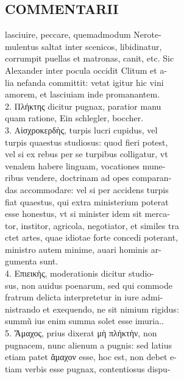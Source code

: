 \documentclass{article}
\begin{document}
\begin{pages}
\section*{COMMENTARII \\
                }lasciuire, peccare, quemadmodum Nerote- \\
                mulentus saltat inter scenicos, libidinatur, \\
                corrumpit puellas et matronas, canit, etc. Sic \\
                Alexander inter pocula occidit Clitum et a- \\
                lia nefanda committit: vetat igitur hic vini \\
                amorem, et lasciuiam inde promanantem. \\
                2. Πλήκτης dicitur pugnax, paratior manu \\
                quam ratione, Ein schlegler, boccher. \\
                3. Αἰσχροκερδὴς, turpis lucri cupidus, vel \\
                turpis quaestus studiosus: quod fieri potest, \\
                vel si ex rebus per se turpibus colligatur, vt \\
                venalem habere linguam, vocationes mune- \\
                ribus vendere, doctrinam ad opes comparan- \\
                das accommodare: vel si per accidens turpis \\
                fiat quaestus, qui extra ministerium poterat \\
                esse honestus, vt si minister idem sit merca- \\
                tor, institor, agricola, negotiator, et similes tra \\
                ctet artes, quae idiotae forte concedi poterant, \\
                ministro autem minime, auari hominis ar- \\
                gumenta sunt. \\
                4. Επιεικὴς, moderationis dicitur studio- \\
                sus, non auidus poenarum, sed qui commode \\
                fratrum delicta interpretetur in iure admi- \\
                nistrando et exequendo, ne sit nimium rigidus: \\
                summũ ius enim summa solet esse imuria.. \\
                5. Ἄμαχος, prius dixerat μὴ πλήκτὴν, non \\
                pugnacem, nunc alienum a pugnis: sed latius \\
                etiam patet ἄμαχον esse, hoc est, non debet e- \\
                tiam verbis esse pugnax, contentiosus dispu- \\
                

\end{pages}
\end{document}
